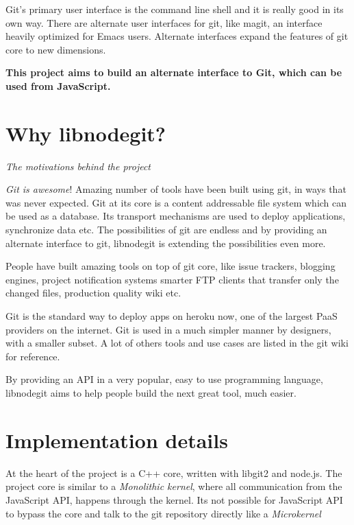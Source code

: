 Git's primary user interface is the command line shell and it is really good in
its own way. There are alternate user interfaces for git, like
magit\cite{magit}, an interface heavily optimized for Emacs\cite{emacs} users.
Alternate interfaces expand the features of git core to new dimensions.

\textbf{This project aims to build an alternate interface to Git, which can be
  used from JavaScript.}

\section{Why libnodegit?}

\newcommand\sectionTitle[1]{\begin{flushright}\textit{#1}\end{flushright}}
\sectionTitle{The motivations behind the project}

\textit{Git is awesome}! Amazing number of tools have been built using
git, in ways that was never expected. Git at its core is a content
addressable file system which can be used as a database. Its transport
mechanisms are used to deploy applications, synchronize data etc. The
possibilities of git are endless and by providing an alternate
interface to git, libnodegit is extending the possibilities even more.

People have built amazing tools on top of git core, like issue
trackers\cite{gaskit}, blogging engines\cite{octopress}, project
notification systems\cite{git-dude} smarter FTP clients\cite{git-ftp}
that transfer only the changed files, production
quality\cite{gollum-imporoved} wiki\cite{gollum} etc.

Git is the standard way to deploy apps on heroku\cite{git-heroku} now,
one of the largest PaaS\cite{PaaS} providers on the internet. Git is
used in a much simpler manner by designers\cite{git-designers}, with a
smaller subset. A lot of others tools and use cases are listed in the
git wiki\cite{git-tools} for reference.

By providing an API in a very popular, easy to use programming
language, libnodegit aims to help people build the next great tool,
much easier.

\section{Implementation details}

At the heart of the project is a C++ core, written with libgit2 and node.js. The
project core is similar to a \textit{Monolithic kernel}\cite{monolithic-kernel},
where all communication from the JavaScript API, happens through the kernel. Its
not possible for JavaScript API to bypass the core and talk to the git
repository directly like a \textit{Microkernel}\cite{microkernel}

